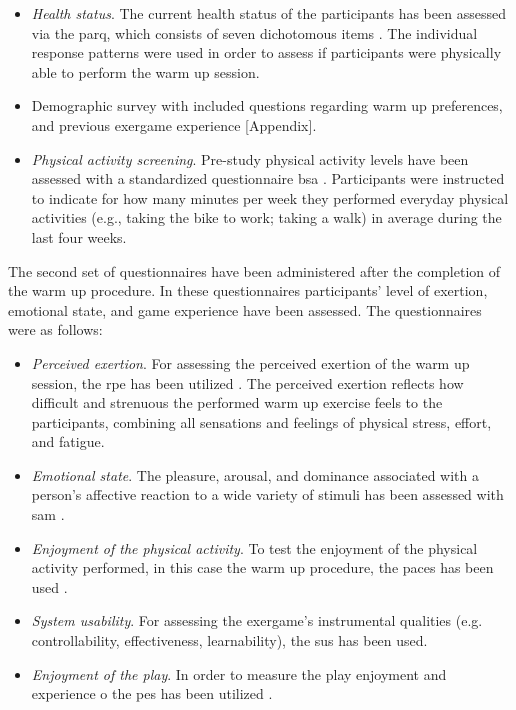 \begin{itemize}

\item \textit{Health status}. The current health status of the participants has been assessed via the \gls{parq}, which consists of seven dichotomous items \cite{thomas1992revision}. The individual response patterns were used in order to assess if participants were physically able to perform the warm up session.
\item Demographic survey with included questions regarding warm up preferences, and previous exergame experience [Appendix].
\item \textit{Physical activity screening}. Pre-study physical activity levels have been assessed with a standardized questionnaire  \gls{bsa} \cite{fuchs2015messung}. Participants were instructed to indicate for how many minutes per week they performed everyday physical activities (e.g., taking the bike to work; taking a walk) in average during the last four weeks. 
\end{itemize}
The second set of questionnaires have been administered after the completion of the warm up procedure. In these questionnaires participants' level of exertion, emotional state, and game experience have been assessed. The questionnaires were as follows:
\begin{itemize}
\item \textit{Perceived exertion}. For assessing the perceived exertion of the warm up session, the \gls{rpe} has been utilized \cite{borg1998borg}. The perceived exertion reflects how difficult and strenuous the performed warm up exercise feels to the participants, combining all sensations and feelings of physical stress, effort, and fatigue.
\item \textit{Emotional state}. The pleasure, arousal, and dominance associated with a person's affective reaction to a wide variety of stimuli has been assessed with \gls{sam} \cite{bradley1994measuring}. 
\item \textit{Enjoyment of the physical activity}. To test the enjoyment of the physical activity performed, in this case the warm up procedure, the \gls{paces} has been used \cite{kendzierski1991physical}. 
\item \textit{System usability}. For assessing the exergame's instrumental qualities (e.g. controllability, effectiveness, learnability), the \gls{sus} has been used.
\item \textit{Enjoyment of the play}. In order to measure the play enjoyment and experience o the \gls{pes} has been utilized \cite{pavlas2012play}. 
\end{itemize}
